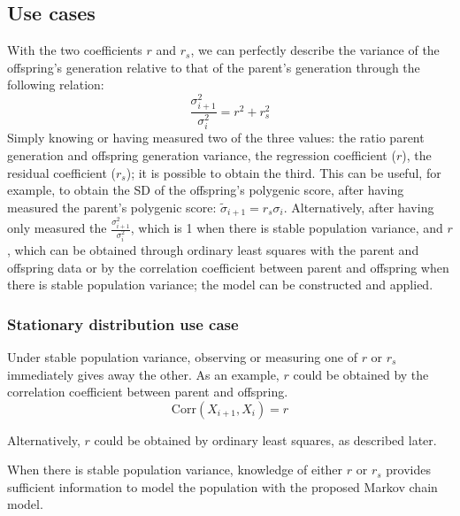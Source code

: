 \documentclass[letterpaper,10pt]{article} %
\begin{document}
\subsection*{Use cases}
With the two coefficients $r$ and $r_s$, we can perfectly describe the variance of the offspring's generation relative to that of the parent's generation through the following relation:
%
$$\frac{\sigma_{i+1}^2}{\sigma_i^2} = r^2+r_s^2$$
%
Simply knowing or having measured two of the three values: the ratio parent generation and offspring generation variance, the regression coefficient ($r$), the residual coefficient ($r_s$); it is possible to obtain the third.
%
This can be useful, for example, to obtain the SD of the offspring's polygenic score, after having measured the parent's polygenic score: $\tilde{\sigma}_{i+1} = r_s \sigma_i$.
%
Alternatively, after having only measured the $\frac{\sigma_{i+1}^2}{\sigma_i^2}$, which is 1 when there is stable population variance, and $r$, which can be obtained through ordinary least squares with the parent and offspring data or by the correlation coefficient between parent and offspring when there is stable population variance; the model can be constructed and applied.


\subsubsection*{Stationary distribution use case}
Under stable population variance, observing or measuring one of $r$ or $r_s$ immediately gives away the other. As an example, $r$ could be obtained by the correlation coefficient between parent and offspring.  
$$\mathrm{Corr}(X_{i+1}, X_i) = r$$

Alternatively, $r$ could be obtained by ordinary least squares, as described later.

When there is stable population variance, knowledge of either $r$ or $r_s$ provides sufficient information to model the population with the proposed Markov chain model.





\clearpage





\end{document}
